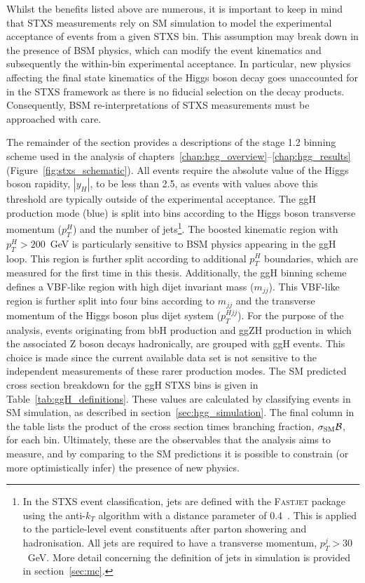 Whilst the benefits listed above are numerous, it is important to keep in mind that STXS measurements rely on SM simulation to model the experimental acceptance of events from a given STXS bin. This assumption may break down in the presence of BSM physics, which can modify the event kinematics and subsequently the within-bin experimental acceptance. In particular, new physics affecting the final state kinematics of the Higgs boson decay goes unaccounted for in the STXS framework as there is no fiducial selection on the decay products. Consequently, BSM re-interpretations of STXS measurements must be approached with care.

The remainder of the section provides a descriptions of the stage 1.2 binning scheme used in the \Hgg analysis of chapters~\ref{chap:hgg_overview}--\ref{chap:hgg_results} (Figure~\ref{fig:stxs_schematic}). All events require the absolute value of the Higgs boson rapidity, $|y_H|$, to be less than 2.5, as events with values above this threshold are typically outside of the experimental acceptance. The ggH production mode (blue) is split into bins according to the Higgs boson transverse momentum ($p_T^H$) and the number of jets\footnote{In the STXS event classification, jets are defined with the \textsc{Fastjet} package~\cite{Cacciari:2011ma} using the anti-$k_T$ algorithm with a distance parameter of 0.4~\cite{Cacciari:2008gp}. This is applied to the particle-level event constituents after parton showering and hadronisation. All jets are required to have a transverse momentum, $p_T^j>30$~GeV. More detail concerning the definition of jets in simulation is provided in section~\ref{sec:mc}.}. The boosted kinematic region with $p_T^H>200$~GeV is particularly sensitive to BSM physics appearing in the ggH loop. This region is further split according to additional $p_T^H$ boundaries, which are measured for the first time in this thesis. Additionally, the ggH binning scheme defines a VBF-like region with high dijet invariant mass ($m_{jj}$). This VBF-like region is further split into four bins according to $m_{jj}$ and the transverse momentum of the Higgs boson plus dijet system ($p_T^{Hjj}$). For the purpose of the \Hgg analysis, events originating from bbH production and ggZH production in which the associated Z boson decays hadronically, are grouped with ggH events. This choice is made since the current available data set is not sensitive to the independent measurements of these rarer production modes. The SM predicted cross section breakdown for the ggH STXS bins is given in Table~\ref{tab:ggH_definitions}. These values are calculated by classifying events in SM simulation, as described in section~\ref{sec:hgg_simulation}. The final column in the table lists the product of the cross section times \Hgg branching fraction, $\sigma_{\rm{SM}}\mathcal{B}$, for each bin. Ultimately, these are the observables that the \Hgg analysis aims to measure, and by comparing to the SM predictions it is possible to constrain (or more optimistically infer) the presence of new physics.

